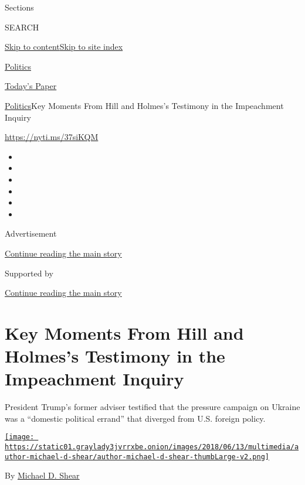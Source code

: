 Sections

SEARCH

\protect\hyperlink{site-content}{Skip to
content}\protect\hyperlink{site-index}{Skip to site index}

\href{https://www.nytimes3xbfgragh.onion/section/politics}{Politics}

\href{https://myaccount.nytimes3xbfgragh.onion/auth/login?response_type=cookie\&client_id=vi}{}

\href{https://www.nytimes3xbfgragh.onion/section/todayspaper}{Today's
Paper}

\href{/section/politics}{Politics}\textbar{}Key Moments From Hill and
Holmes's Testimony in the Impeachment Inquiry

\url{https://nyti.ms/37siKQM}

\begin{itemize}
\item
\item
\item
\item
\item
\item
\end{itemize}

Advertisement

\protect\hyperlink{after-top}{Continue reading the main story}

Supported by

\protect\hyperlink{after-sponsor}{Continue reading the main story}

\hypertarget{key-moments-from-hill-and-holmess-testimony-in-the-impeachment-inquiry}{%
\section{Key Moments From Hill and Holmes's Testimony in the Impeachment
Inquiry}\label{key-moments-from-hill-and-holmess-testimony-in-the-impeachment-inquiry}}

President Trump's former adviser testified that the pressure campaign on
Ukraine was a ``domestic political errand'' that diverged from U.S.
foreign policy.

\href{https://www.nytimes3xbfgragh.onion/by/michael-d-shear}{\texttt{[image: https://static01.graylady3jvrrxbe.onion/images/2018/06/13/multimedia/author-michael-d-shear/author-michael-d-shear-thumbLarge-v2.png]}}

By \href{https://www.nytimes3xbfgragh.onion/by/michael-d-shear}{Michael
D. Shear}

